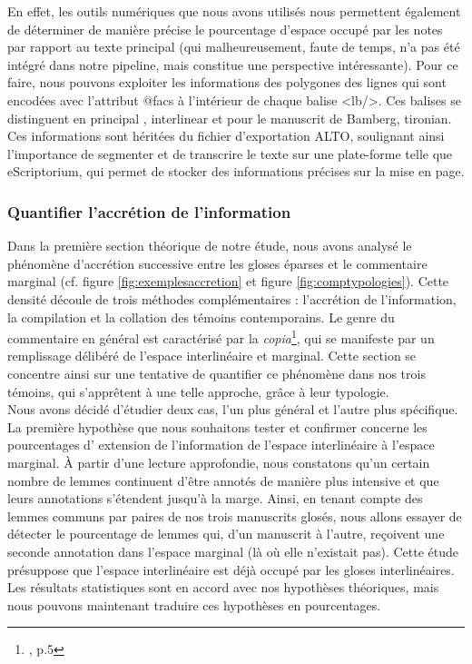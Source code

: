 \documentclass[a4paper, twoside, 12pt]{book}
\begin{document}
{En effet, les outils numériques que nous avons utilisés nous permettent également de déterminer de manière précise le pourcentage d'espace occupé par les notes par rapport au texte principal (qui malheureusement, faute de temps, n'a pas été intégré dans notre pipeline, mais constitue une perspective intéressante). Pour ce faire, nous pouvons exploiter les informations des polygones des lignes qui sont encodées avec l'attribut @facs à l'intérieur de chaque balise <lb/>. Ces balises se distinguent en \og{}principal\fg{} , \og{}interlinear\fg{}  et pour le manuscrit de Bamberg, \og{}tironian\fg{}. Ces informations sont héritées du fichier d'exportation ALTO, soulignant ainsi l'importance de segmenter et de transcrire le texte sur une plate-forme telle que eScriptorium, qui permet de stocker des informations précises sur la mise en page.

\subsubsection{Quantifier l'accrétion de l'information}

Dans la première section théorique de notre étude, nous avons analysé le phénomène d'accrétion successive entre les gloses éparses et le commentaire marginal (cf. figure \ref{fig:exemplesaccretion} et figure \ref{fig:comptypologies}). Cette densité découle de trois méthodes complémentaires : l'accrétion de l'information, la compilation et la collation des témoins contemporains. Le genre du commentaire en général est caractérisé par la \textit{copia}\footnote{\cite{kraus2002introduction}, p.5}, qui se manifeste par un remplissage délibéré de l'espace interlinéaire et marginal. Cette section se concentre ainsi sur une tentative de quantifier ce phénomène dans nos trois témoins, qui s'apprêtent à une telle approche, grâce à leur typologie.\\ 
 
Nous avons décidé d'étudier deux cas, l'un plus général et l'autre plus spécifique. La première hypothèse que nous souhaitons tester et confirmer concerne les pourcentages d'\og{} extension \fg{} de l'information de l'espace interlinéaire à l'espace marginal. À partir d'une lecture approfondie, nous constatons qu'un certain nombre de lemmes continuent d'être annotés de manière plus intensive et que leurs annotations s'étendent jusqu'à la marge. Ainsi, en tenant compte des lemmes communs \og{}par paires\fg{} de nos trois manuscrits glosés, nous allons essayer de détecter le pourcentage de lemmes qui, d'un manuscrit à l'autre, reçoivent une seconde annotation dans l'espace marginal (là où elle n'existait pas). Cette étude présuppose que l'espace interlinéaire est déjà \og{}occupé\fg{} par les gloses interlinéaires. Les résultats statistiques sont en accord avec nos hypothèses théoriques, mais nous pouvons maintenant traduire ces hypothèses en pourcentages.\\

}
\end{document}
